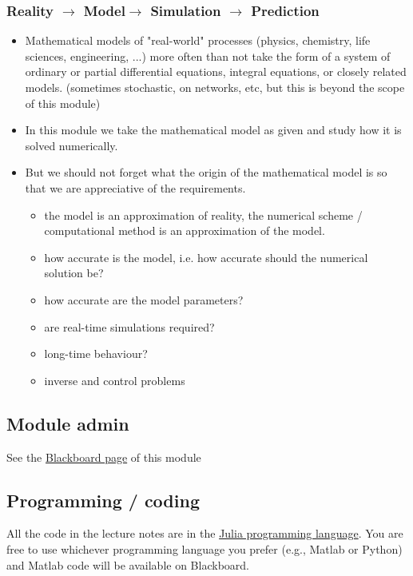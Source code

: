 \documentclass[12pt,landscape]{article}
\begin{document}
{\begin{itemize}
\end{itemize}
\subsubsection{Reality $\rightarrow$ Model$\rightarrow$ Simulation $\rightarrow$ Prediction}
\begin{itemize}
\item Mathematical models of "real-world" processes (physics, chemistry, life sciences, engineering, ...) more often than not take the form of a system of ordinary or partial differential equations, integral equations, or closely related models. (sometimes stochastic, on networks, etc, but this is beyond the scope of this module) 


\item In this module we take the mathematical model as given and study how it is solved numerically.


\item But we should not forget what the origin of the mathematical model is so that we are appreciative of the requirements. 

\begin{itemize}
\item the model is an approximation of reality, the numerical scheme / computational method is an approximation of the model.


\item how accurate is the model, i.e. how accurate should the numerical solution be? 


\item how accurate are the model parameters? 


\item are real-time simulations required?


\item long-time behaviour? 


\item inverse and control problems

\end{itemize}
\end{itemize}
\subsection{Module admin}
See the \href{https://blackboard.le.ac.uk/}{Blackboard page} of this module

\subsection{Programming / coding}
All the code in the lecture notes are in the \href{https://julialang.org/}{Julia programming language}. You are free to use whichever programming language you prefer (e.g., Matlab or Python) and Matlab code will be available on Blackboard.

}
\end{document}
